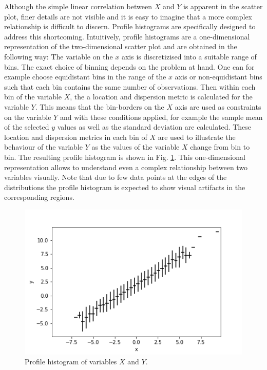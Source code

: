 \documentclass[BCOR=1mm, DIV=calc,10pt,
twoside=true,
twocolumn,
headings=normal]{scrartcl}
\newcommand{\fig}{Fig. }
\begin{document}
Although the simple linear correlation between $X$ and $Y$ is apparent in the scatter plot, finer details are not visible and it is easy to imagine that a more complex relationship is difficult to discern. Profile histograms are specifically designed to address this shortcoming. Intuitively, profile histograms are a one-dimensional representation of the two-dimensional scatter plot and are obtained  in the following way: The variable on the $x$ axis is discretizised into a suitable range of bins. The exact choice of binning depends on the problem at hand. One can for example choose equidistant bins in the range of the $x$ axis or non-equidistant bins such that each bin contains the same number of observations. Then within each bin of the variable $X$, the a location and dispersion metric is calculated for the variable $Y$. This means that the bin-borders on the $X$ axis are used as constraints on the variable $Y$ and with these conditions applied, for example the sample mean of the selected $y$ values as well as the standard deviation are calculated. These location and dispersion metrics in each bin of $X$ are used to illustrate the behaviour of the variable $Y$ as the values of the variable $X$ change from bin to bin. The resulting profile histogram is shown in \fig \ref{fig:profile}. This one-dimensional representation allows to understand even a complex relationship between two variables visually. Note that due to few data points at the edges of the distributions the profile histogram is expected to show visual artifacts in the corresponding regions.

 \begin{figure}
\begin{center}
\includegraphics[scale=0.5]{../figures/profile}
\caption{\label{fig:profile} Profile histogram of variables $X$ and $Y$.}
\end{center}
\end{figure} 
\end{document}
